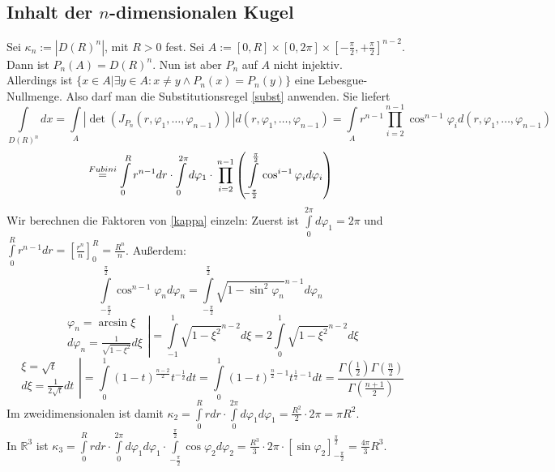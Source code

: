 \documentclass[a4paper,11pt]{scrartcl}
\newcommand{\R}{{\ensuremath{\mathbb{R}}}}
\begin{document}
\subsection{Inhalt der $n$-dimensionalen Kugel}
Sei $\kappa_n:=|D(R)^n|$, mit $R>0$ fest. Sei $A:=[0,R]\times[0,2\pi]\times[-\frac{\pi}{2},+\frac{\pi}{2}]^{n-2}$. Dann ist $P_n(A)=D(R)^n$. Nun ist aber $P_n$ auf $A$ nicht injektiv.\\
Allerdings ist $\{x\in A|\exists y\in A: x\neq y \wedge P_n(x)=P_n(y)\}$ eine Lebesgue-Nullmenge. Also darf man die Substitutionsregel \eqref{subst} anwenden. Sie liefert
\[\int\limits_{D(R)^n}dx=\int\limits_A |\det(J_{P_n}(r,\varphi_1,\ldots,\varphi_{n-1}))|d(r,\varphi_1,\ldots,\varphi_{n-1})=
\int\limits_A r^{n-1}\prod\limits_{i=2}^{n-1}\cos^{n-1}\varphi_i d(r,\varphi_1,\ldots,\varphi_{n-1}) \]
\begin{equation}\label{kappa}\stackrel{Fubini}{=}\int\limits_0^R r^{n-1}dr\cdot\int\limits_0^{2\pi}d\varphi_1\cdot \\ \prod\limits_{i=2}^{n-1}\left(\int\limits_{-\frac{\pi}{2}}^\frac{\pi}{2} \cos^{i-1}\varphi_i d\varphi_i\right)
\end{equation}
Wir berechnen die Faktoren von \eqref{kappa} einzeln:
Zuerst ist $\int\limits_0^{2\pi}d\varphi_1=2\pi$ und $\int\limits_0^R r^{n-1}dr=\left[\frac{r^n}{n}\right]_0^R=\frac{R^n}{n}$. Außerdem:
$$\int\limits_{-\frac{\pi}{2}}^\frac{\pi}{2} \cos^{n-1}\varphi_n d\varphi_n=\int\limits_{-\frac{\pi}{2}}^\frac{\pi}{2} \sqrt{1-\sin^2\varphi_n}^{n-1} d\varphi_n$$
$$\left. \begin{array}{c} \varphi_n= \arcsin \xi \\ d\varphi_n = \frac{1}{\sqrt{1-\xi^2}}d\xi\end{array}\right|
=\int\limits_{-1}^1 \sqrt{1-\xi^2}^{n-2}d\xi=2\int\limits_0^1\sqrt{1-\xi^2}^{n-2}d\xi$$
$$\left. \begin{array}{c} \xi= \sqrt{t} \\ d\xi = \frac{1}{2\sqrt{t}}dt\end{array}\right|
=\int\limits_0^1 (1-t)^\frac{n-2}{2}t^{-\frac{1}{2}}dt = \int\limits_0^1 (1-t)^{\frac{n}{2}-1}t^{\frac{1}{2}-1}dt
=\frac{\Gamma(\frac{1}{2})\Gamma(\frac{n}{2})}{\Gamma(\frac{n+1}{2})}$$
Im zweidimensionalen ist damit $\kappa_2=\int\limits_0^R rdr\cdot \int\limits_0^{2\pi}d\varphi_1 d\varphi_1=\frac{R^2}{2}\cdot 2\pi=\pi R^2$.\\
In $\R^3$ ist $\kappa_3=\int\limits_0^R rdr\cdot \int\limits_0^{2\pi}d\varphi_1 d\varphi_1\cdot \int\limits_{-\frac{\pi}{2}}^\frac{\pi}{2} \cos\varphi_2 d\varphi_2=\frac{R^3}{3}\cdot 2\pi\cdot[\sin\varphi_2]_{-\frac{\pi}{2}}^\frac{\pi}{2}=\frac{4\pi}{3} R^3$.\\
\end{document}
